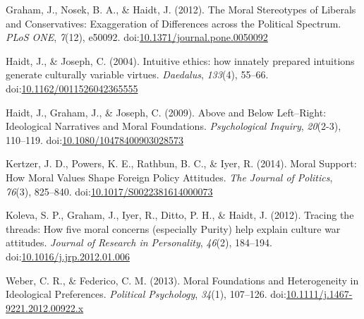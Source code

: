 \documentclass[english,man]{apa6}
\theoremstyle{definition}
\theoremstyle{definition}
\theoremstyle{definition}
\theoremstyle{remark}
\begin{document}
\hypertarget{ref-Graham2012}{}
Graham, J., Nosek, B. A., \& Haidt, J. (2012). The Moral Stereotypes of
Liberals and Conservatives: Exaggeration of Differences across the
Political Spectrum. \emph{PLoS ONE}, \emph{7}(12), e50092.
doi:\href{https://doi.org/10.1371/journal.pone.0050092}{10.1371/journal.pone.0050092}

\hypertarget{ref-Haidt2004}{}
Haidt, J., \& Joseph, C. (2004). Intuitive ethics: how innately prepared
intuitions generate culturally variable virtues. \emph{Daedalus},
\emph{133}(4), 55--66.
doi:\href{https://doi.org/10.1162/0011526042365555}{10.1162/0011526042365555}

\hypertarget{ref-Haidt2009}{}
Haidt, J., Graham, J., \& Joseph, C. (2009). Above and Below
Left--Right: Ideological Narratives and Moral Foundations.
\emph{Psychological Inquiry}, \emph{20}(2-3), 110--119.
doi:\href{https://doi.org/10.1080/10478400903028573}{10.1080/10478400903028573}

\hypertarget{ref-Kertzer2014}{}
Kertzer, J. D., Powers, K. E., Rathbun, B. C., \& Iyer, R. (2014). Moral
Support: How Moral Values Shape Foreign Policy Attitudes. \emph{The
Journal of Politics}, \emph{76}(3), 825--840.
doi:\href{https://doi.org/10.1017/S0022381614000073}{10.1017/S0022381614000073}

\hypertarget{ref-Koleva2012}{}
Koleva, S. P., Graham, J., Iyer, R., Ditto, P. H., \& Haidt, J. (2012).
Tracing the threads: How five moral concerns (especially Purity) help
explain culture war attitudes. \emph{Journal of Research in
Personality}, \emph{46}(2), 184--194.
doi:\href{https://doi.org/10.1016/j.jrp.2012.01.006}{10.1016/j.jrp.2012.01.006}

\hypertarget{ref-Weber2013}{}
Weber, C. R., \& Federico, C. M. (2013). Moral Foundations and
Heterogeneity in Ideological Preferences. \emph{Political Psychology},
\emph{34}(1), 107--126.
doi:\href{https://doi.org/10.1111/j.1467-9221.2012.00922.x}{10.1111/j.1467-9221.2012.00922.x}
\end{document}
